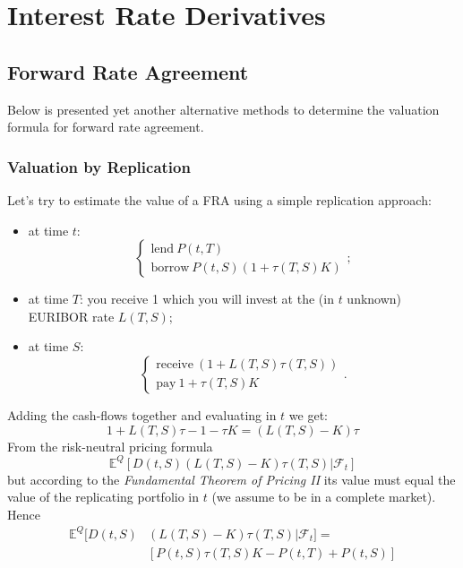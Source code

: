 \documentclass[12pt,a4paper]{book}
\newcommand{\myendproof}{\hfill\qedsymbol}
\begin{document}
\chapter{Interest Rate Derivatives}
\section{Forward Rate Agreement}
Below is presented yet another alternative methods to determine the valuation formula for forward rate agreement.

\subsection{Valuation by Replication}
Let's try to estimate the value of a FRA using a simple replication approach:
\begin{itemize}
\item at time $t$: 
	\begin{equation*}
	\begin{cases}
		\text{lend}~P(t,T)\\
		\text{borrow}~P(t,S)(1+\tau(T,S)K)
	\end{cases};
	\end{equation*}
\item at time $T$: you receive 1 which you will invest at the (in $t$ unknown) EURIBOR rate $L(T,S)$;
\item at time $S$: 
	\begin{equation*}
		\begin{cases}
			\text{receive}~(1+L(T,S)\tau(T,S))\\
			\text{pay}~1 + \tau(T,S)K
		\end{cases}.
	\end{equation*}
\end{itemize}

Adding the cash-flows together and evaluating in $t$ we get:
\begin{equation*}
	1+L(T,S)\tau - 1 - \tau K = (L(T,S)-K)\tau
\end{equation*}
From the risk-neutral pricing formula
	\begin{equation*}
		\mathbb{E}^Q[D(t, S)(L(T, S)-K)\tau(T,S)|\mathcal{F}_t]
	\end{equation*}
but according to the \emph{Fundamental Theorem of Pricing II} its value must equal the value of the replicating portfolio in $t$ (we assume to be in a complete market). Hence
\begin{equation}
	\begin{aligned}
		\mathbb{E}^Q[D(t,S)&(L(T,S)-K)\tau(T,S)|\mathcal{F}_t]=\\
			&[P(t,S)\tau(T,S)K-P(t,T)+P(t,S)]
			\label{eq:fra_as_expectation}
	\end{aligned}
\end{equation}
\end{document}
